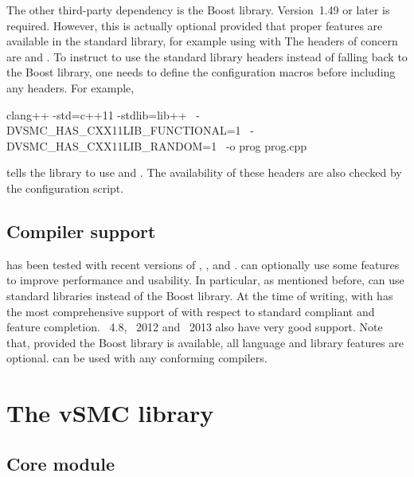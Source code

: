 The other third-party dependency is the Boost library. Version~1.49 or later
is required. However, this is actually optional provided that proper \cppoo
features are available in the standard library, for example using \clang with
\libcpp The \cppoo headers of concern are  and
. To instruct \vsmc to use the standard library headers
instead of falling back to the Boost library, one needs to define the
configuration macros before including any \vsmc headers. For example,
\begin{shcode}
clang++ -std=c++11 -stdlib=lib++     \
    -DVSMC_HAS_CXX11LIB_FUNCTIONAL=1  \
    -DVSMC_HAS_CXX11LIB_RANDOM=1      \
    -o prog prog.cpp
\end{shcode}
tells the library to use \cppoo{}  and
\cppinline{<random>}. The availability of these headers are also checked by
the \cmake configuration script.

\subsection{Compiler support}

\vsmc has been tested with recent versions of \clang, \gcc, \icpc and \msvc.
\vsmc can optionally use some \cppoo features to improve performance and
usability. In particular, as mentioned before, \vsmc can use \cppoo standard
libraries instead of the Boost library. At the time of writing, \clang with
\libcpp has the most comprehensive support of \cppoo with respect to standard
compliant and feature completion. \gcc~4.8, \msvc~2012 and \icpc~2013 also
have very good \cppoo support. Note that, provided the Boost library is
available, all \cppoo language and library features are optional. \vsmc can be
used with any \cppne conforming compilers.

\section{The vSMC library}
\label{sec:The vSMC library}

\subsection{Core module}
\label{sub:Core module}

